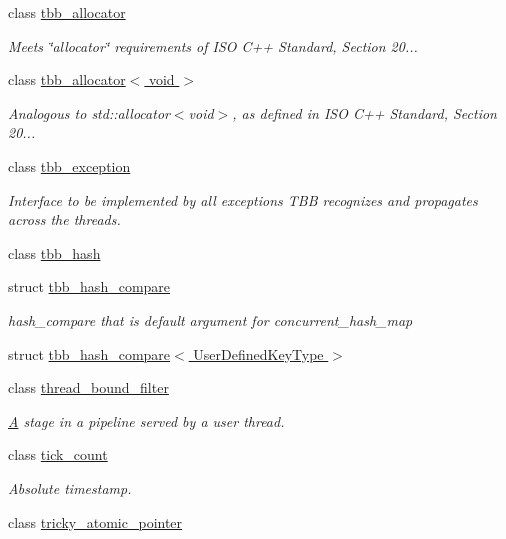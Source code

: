 \begin{DoxyCompactItemize}
class \hyperlink{classtbb_1_1tbb__allocator}{tbb\+\_\+allocator}
\begin{DoxyCompactList}\small\item\em Meets \char`\"{}allocator\char`\"{} requirements of I\+S\+O C++ Standard, Section 20... \end{DoxyCompactList}\item 
class \hyperlink{classtbb_1_1tbb__allocator_3_01void_01_4}{tbb\+\_\+allocator$<$ void $>$}
\begin{DoxyCompactList}\small\item\em Analogous to std\+::allocator$<$void$>$, as defined in I\+S\+O C++ Standard, Section 20... \end{DoxyCompactList}\item 
class \hyperlink{classtbb_1_1tbb__exception}{tbb\+\_\+exception}
\begin{DoxyCompactList}\small\item\em Interface to be implemented by all exceptions T\+B\+B recognizes and propagates across the threads. \end{DoxyCompactList}\item 
class \hyperlink{classtbb_1_1tbb__hash}{tbb\+\_\+hash}
\item 
struct \hyperlink{structtbb_1_1tbb__hash__compare}{tbb\+\_\+hash\+\_\+compare}
\begin{DoxyCompactList}\small\item\em hash\+\_\+compare that is default argument for concurrent\+\_\+hash\+\_\+map \end{DoxyCompactList}\item 
struct \hyperlink{structtbb_1_1tbb__hash__compare_3_01UserDefinedKeyType_01_4}{tbb\+\_\+hash\+\_\+compare$<$ User\+Defined\+Key\+Type $>$}
\item 
class \hyperlink{classtbb_1_1thread__bound__filter}{thread\+\_\+bound\+\_\+filter}
\begin{DoxyCompactList}\small\item\em \hyperlink{structA}{A} stage in a pipeline served by a user thread. \end{DoxyCompactList}\item 
class \hyperlink{classtbb_1_1tick__count}{tick\+\_\+count}
\begin{DoxyCompactList}\small\item\em Absolute timestamp. \end{DoxyCompactList}\item 
class \hyperlink{classtbb_1_1tricky__atomic__pointer}{tricky\+\_\+atomic\+\_\+pointer}

\end{DoxyCompactItemize}
